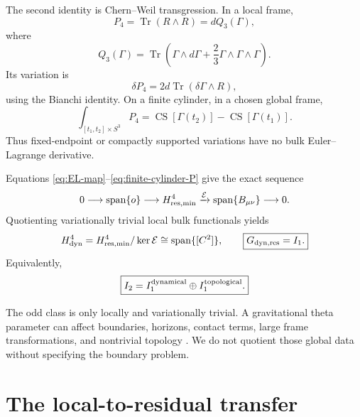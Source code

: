 \documentclass[11pt]{article}
\theoremstyle{definition}
\theoremstyle{remark}
\newcommand{\cE}{\mathcal E}
\newcommand{\Tr}{\operatorname{Tr}}
\newcommand{\CS}{\operatorname{CS}}
\begin{document}
The second identity is Chern--Weil transgression.  In a local frame,
\begin{equation}\label{eq:chern-weil}
 P_4=\Tr(R\wedge R)=dQ_3(\Gamma),
\end{equation}
where
\begin{equation}\label{eq:CS3}
 Q_3(\Gamma)=\Tr\left(
 \Gamma\wedge d\Gamma+\frac23\Gamma\wedge\Gamma\wedge\Gamma
 \right).
\end{equation}
Its variation is
\begin{equation}\label{eq:Pvariation}
 \delta P_4=2d\Tr(\delta\Gamma\wedge R),
\end{equation}
using the Bianchi identity.  On a finite cylinder, in a chosen global frame,
\begin{equation}\label{eq:finite-cylinder-P}
 \int_{[t_1,t_2]\times S^3}P_4
 =\CS[\Gamma(t_2)]-\CS[\Gamma(t_1)].
\end{equation}
Thus fixed-endpoint or compactly supported variations have no bulk
Euler--Lagrange derivative.

Equations \eqref{eq:EL-map}--\eqref{eq:finite-cylinder-P} give the exact
sequence
\begin{equation}\label{eq:EL-exact-sequence}
 0\longrightarrow\operatorname{span}\{o\}
 \longrightarrow H^4_{\rm res,min}
 \xrightarrow{\cE}\operatorname{span}\{B_{\mu\nu}\}
 \longrightarrow0.
\end{equation}
Quotienting variationally trivial local bulk functionals yields
\begin{equation}\label{eq:dynamic-quotient}
 H^4_{\rm dyn}
 =H^4_{\rm res,min}/\ker\cE
 \cong\operatorname{span}\{[C^2]\},
 \qquad
 \boxed{G_{\rm dyn,res}=I_1.}
\end{equation}
Equivalently,
\begin{equation}\label{eq:I2-split}
 \boxed{I_2=I_1^{\rm dynamical}\oplus I_1^{\rm topological}.}
\end{equation}

The odd class is only locally and variationally trivial.  A gravitational
theta parameter can affect boundaries, horizons, contact terms, large frame
transformations, and nontrivial topology \cite{FischlerKundu}.  We do not
quotient those global data without specifying the boundary problem.

\section{The local-to-residual transfer}\label{sec:transfer}
\end{document}
